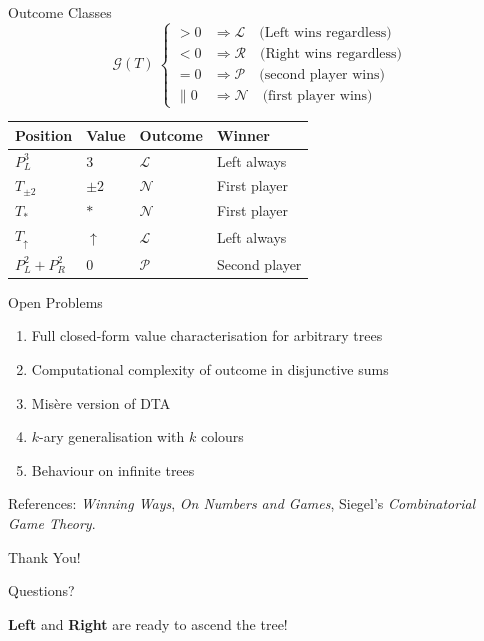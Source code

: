 \documentclass[10pt]{beamer}
\newcommand{\Lopt}[1]{{\color{lblue}\textbf{#1}}}
\newcommand{\Ropt}[1]{{\color{rred}\textbf{#1}}}
\newcommand{\Gv}[1]{\mathcal{G}(#1)}
\begin{document}
\begin{frame}{Outcome Classes}
  \[
    \Gv{T}\ 
    \begin{cases}
      > 0  & \Rightarrow \mathcal{L} \quad \text{(Left wins regardless)}\\
      < 0  & \Rightarrow \mathcal{R} \quad \text{(Right wins regardless)}\\
      = 0  & \Rightarrow \mathcal{P} \quad \text{(second player wins)}\\
      \| 0 & \Rightarrow \mathcal{N} \quad \text{(first player wins)}
    \end{cases}
  \]

  \vspace{10pt}
  \small
  \begin{tabular}{@{}llll@{}}
    \toprule
    Position & Value & Outcome & Winner \\
    \midrule
    $P^3_L$         & $3$      & $\mathcal{L}$ & Left always \\
    $T_{\pm 2}$     & $\pm 2$  & $\mathcal{N}$ & First player \\
    $T_*$           & $*$      & $\mathcal{N}$ & First player \\
    $T_\uparrow$    & $\uparrow$ & $\mathcal{L}$ & Left always \\
    $P^2_L + P^2_R$ & $0$      & $\mathcal{P}$ & Second player \\
    \bottomrule
  \end{tabular}
\end{frame}

\begin{frame}{Open Problems}
  \begin{enumerate}[label=\small(\roman*)]
    \item Full closed-form value characterisation for arbitrary trees
    \item Computational complexity of outcome in disjunctive sums
    \item Misère version of DTA
    \item $k$-ary generalisation with $k$ colours
    \item Behaviour on infinite trees
  \end{enumerate}
  
  \bigskip
  \small References: \emph{Winning Ways}, \emph{On Numbers and Games}, Siegel's \emph{Combinatorial Game Theory}.
\end{frame}

\begin{frame}
  \centering
  \Huge Thank You!
  
  \bigskip
  \Large Questions?
  
  \bigskip\bigskip
  \Lopt{Left} and \Ropt{Right} are ready to ascend the tree!
\end{frame}
\end{document}
